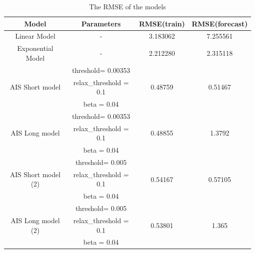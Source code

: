 \documentclass{assignment}
\begin{document}
\begin{table}
\begin{center}
  \begin{tabular}{|c|c|c|c|}
    \hline
    {\bf Model} & {\bf Parameters} & {\bf RMSE(train)} & {\bf RMSE(forecast)}\\ \hline \hline

	Linear Model & - & 3.183062 & 7.255561 \\ \hline

	Exponential Model & - & 2.212280 & 2.315118 \\ \hline

	\multirow{3}{*}{AIS Short model} &

	 threshold= 0.00353 & \multirow{3}{*}{0.48759} & \multirow{3}{*}{0.51467} \\ 
	 & relax\_threshold = 0.1 & & \\
	 & beta = 0.04 & & \\ \hline

	\multirow{3}{*}{AIS Long model} &

	 threshold= 0.00353 & \multirow{3}{*}{0.48855} & \multirow{3}{*}{1.3792} \\ 
	 & relax\_threshold = 0.1 & & \\
	 & beta = 0.04 & & \\ \hline

	\multirow{3}{*}{AIS Short model (2)} &

	 threshold= 0.005 & \multirow{3}{*}{0.54167} & \multirow{3}{*}{0.57105} \\ 
	 & relax\_threshold = 0.1 & & \\
	 & beta = 0.04 & & \\ \hline

	\multirow{3}{*}{AIS Long model (2)} &

	 threshold= 0.005 & \multirow{3}{*}{0.53801} & \multirow{3}{*}{1.365} \\ 
	 & relax\_threshold = 0.1 & & \\
	 & beta = 0.04 & & \\ \hline

\hline \hline
  \end{tabular}
\caption{The RMSE of the models}
\label{table:model_parameters}
\end{center}
\end{table}

\clearpage
{} \label{Bibliography}
\printbibliography

\newpage
\end{document}
